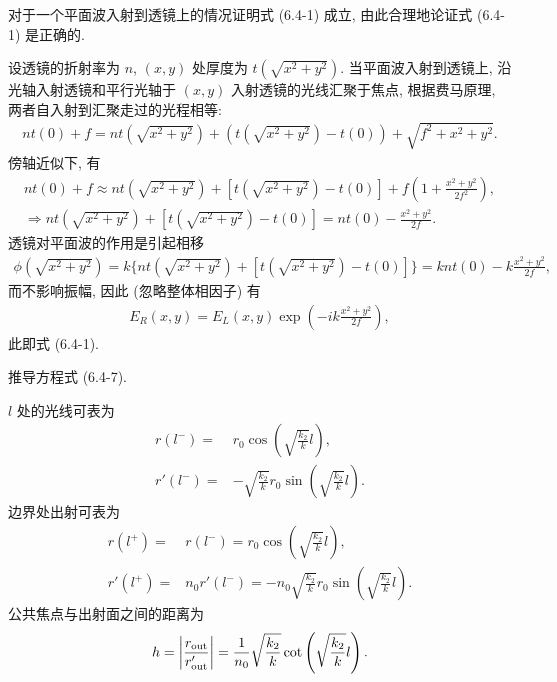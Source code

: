 \documentclass{note}
\begin{document}
\begin{exe}
    对于一个平面波入射到透镜上的情况证明式 (6.4-1) 成立, 由此合理地论证式 (6.4-1) 是正确的.
\end{exe}
\begin{pf}
    设透镜的折射率为 $n$, $(x,y)$ 处厚度为 $t(\sqrt{x^2+y^2})$. 当平面波入射到透镜上, 沿光轴入射透镜和平行光轴于 $(x,y)$ 入射透镜的光线汇聚于焦点, 根据费马原理, 两者自入射到汇聚走过的光程相等:
    \begin{align}
        nt(0)+f=nt(\sqrt{x^2+y^2})+(t(\sqrt{x^2+y^2})-t(0))+\sqrt{f^2+x^2+y^2}.
    \end{align}
    傍轴近似下, 有
    \begin{gather}
        nt(0)+f\approx nt(\sqrt{x^2+y^2})+[t(\sqrt{x^2+y^2})-t(0)]+f\left(1+\frac{x^2+y^2}{2f^2}\right),\\
        \Longrightarrow nt(\sqrt{x^2+y^2})+[t(\sqrt{x^2+y^2})-t(0)]=nt(0)-\frac{x^2+y^2}{2f}.
    \end{gather}
    透镜对平面波的作用是引起相移
    \begin{align}
        \phi(\sqrt{x^2+y^2})=k\{nt(\sqrt{x^2+y^2})+[t(\sqrt{x^2+y^2})-t(0)]\}=knt(0)-k\frac{x^2+y^2}{2f},
    \end{align}
    而不影响振幅, 因此 (忽略整体相因子) 有
    \begin{align}
        E_R(x,y)=E_L(x,y)\exp\left(-ik\frac{x^2+y^2}{2f}\right),
    \end{align}
    此即式 (6.4-1).
\end{pf}

\begin{exe}
    推导方程式 (6.4-7).
\end{exe}
\begin{pf}
    $l$ 处的光线可表为
    \begin{align}
        r(l^-)=&r_0\cos\left(\sqrt{\frac{k_2}{k}}l\right),\\
        r'(l^-)=&-\sqrt{\frac{k_2}{k}}r_0\sin\left(\sqrt{\frac{k_2}{k}}l\right).
    \end{align}
    边界处出射可表为
    \begin{align}
        r(l^+)=&r(l^-)=r_0\cos\left(\sqrt{\frac{k_2}{k}}l\right),\\
        r'(l^+)=&n_0r'(l^-)=-n_0\sqrt{\frac{k_2}{k}}r_0\sin\left(\sqrt{\frac{k_2}{k}}l\right).
    \end{align}
    公共焦点与出射面之间的距离为
    \begin{gather}
        h=\left\lvert\frac{r_{\text{out}}}{r'_{\text{out}}}\right\rvert=\frac{1}{n_0}\sqrt{\frac{k_2}{k}}\cot\left(\sqrt{\frac{k_2}{k}}l\right).
    \end{gather}
\end{pf}
\end{document}
